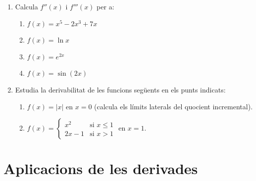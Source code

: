 \documentclass[12pt]{article}
\begin{document}
\begin{enumerate}[label=\arabic*.]
    \item Calcula $f''(x)$ i $f'''(x)$ per a:
    \begin{enumerate}[label=\alph*)]
        \item $f(x)=x^5-2x^3+7x$
        \item $f(x)=\ln x$
        \item $f(x)=e^{2x}$
        \item $f(x)=\sin(2x)$
    \end{enumerate}

    \item Estudia la derivabilitat de les funcions següents en els punts indicats:
    \begin{enumerate}[label=\alph*)]
        \item $f(x)=|x|$ en $x=0$ (calcula els límits laterals del quocient incremental).
        \item $f(x)=
        \begin{cases}
            x^2 & \text{si } x\le 1 \\
            2x-1 & \text{si } x>1
        \end{cases}$
        en $x=1$.
    \end{enumerate}
\end{enumerate}

\section*{Aplicacions de les derivades}
\end{document}
